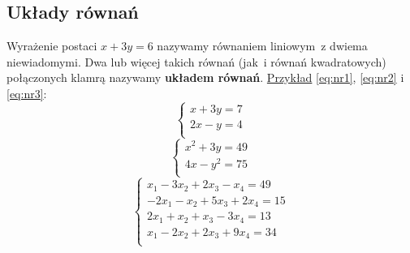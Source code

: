 \documentclass[12pt, a4paper]{article}
\begin{document}
\subsection{Układy równań}
\label{rownania}
Wyrażenie postaci $x+3y=6$ nazywamy równaniem liniowym~z dwiema niewiadomymi. Dwa lub więcej takich równań (jak~i równań kwadratowych) połączonych klamrą nazywamy \textbf{układem równań}.
\newline\underline{Przykład} \eqref{eq:nr1}, \eqref{eq:nr2} i \eqref{eq:nr3}:
\begin{equation}
\label{eq:nr1}
	\left \{	
	\begin{array}{ll}
	x + 3y = 7 \\
	2x - y = 4 \\
		\end{array}
		\right.
\end{equation}
\begin{equation}
\label{eq:nr2}
	\left \{	
	\begin{array}{ll}
	x^2 + 3y = 49 \\
	4x - y^2 = 75 \\
		\end{array}
		\right.
	\end{equation}
	\begin{equation}
\label{eq:nr3}
	\left \{	
	\begin{array}{ll}
	x_1 - 3x_2 + 2x_3 - x_4 = 49 \\
	-2x_1 - x_2 + 5x_3 + 2x_4 = 15 \\
	2x_1 + x_2 + x_3 - 3x_4 = 13 \\
	x_1 - 2x_2 + 2x_3 + 9x_4 = 34\\
		\end{array}
		\right.
	\end{equation}\cite{matemaks} 
\end{document}
